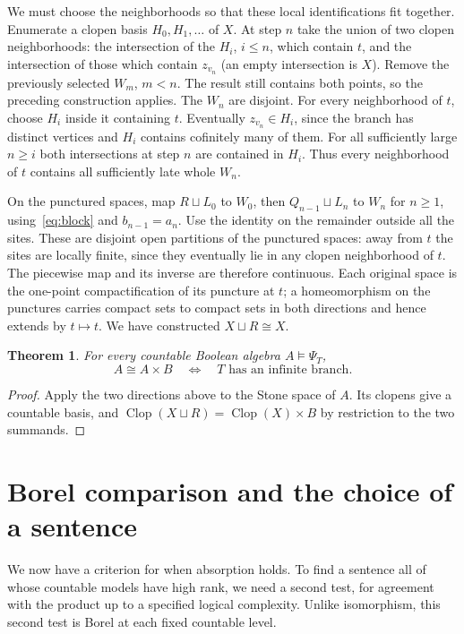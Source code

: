 \documentclass[11pt,letterpaper]{article}
\newtheorem{theorem}{Theorem}[section]
\theoremstyle{definition}\newtheorem{definition}[theorem]{Definition}
\newcommand{\Clop}{\operatorname{Clop}}
\begin{document}
We must choose the neighborhoods so that these local identifications fit
together. Enumerate a clopen basis \(H_0,H_1,\ldots\) of \(X\). At step
\(n\) take the union of two clopen neighborhoods: the intersection of the
\(H_i\), \(i\le n\), which contain \(t\), and the intersection of those
which contain \(z_{v_n}\) (an empty intersection is \(X\)). Remove the
previously selected \(W_m\), \(m<n\). The result still contains both
points, so the preceding construction applies. The \(W_n\) are disjoint.
For every neighborhood of \(t\), choose \(H_i\) inside it containing
\(t\). Eventually \(z_{v_n}\in H_i\), since the branch has distinct
vertices and \(H_i\) contains cofinitely many of them. For all sufficiently
large \(n\ge i\) both intersections at step \(n\) are contained in
\(H_i\). Thus every neighborhood of \(t\) contains all sufficiently late
whole \(W_n\).

On the punctured spaces, map \(R\sqcup L_0\) to \(W_0\), then
\(Q_{n-1}\sqcup L_n\) to \(W_n\) for \(n\ge1\), using~\eqref{eq:block}
and \(b_{n-1}=a_n\). Use the identity on the remainder outside all the
sites. These are disjoint open partitions of the punctured spaces: away
from \(t\) the sites are locally finite, since they eventually lie in
any clopen neighborhood of \(t\). The piecewise map and its inverse are
therefore continuous. Each original space is the one-point compactification
of its puncture at \(t\); a homeomorphism on the punctures carries compact
sets to compact sets in both directions and hence extends by \(t\mapsto t\).
We have constructed \(X\sqcup R\cong X\).

\begin{theorem}\label{thm:absorb}
For every countable Boolean algebra \(A\models\Psi_T\),
\[
                       A\cong A\times B
       \quad\Longleftrightarrow\quad T\text{ has an infinite branch}.
\]
\end{theorem}
\begin{proof}
Apply the two directions above to the Stone space of \(A\). Its clopens
give a countable basis, and \(\Clop(X\sqcup R)=\Clop(X)\times B\) by
restriction to the two summands.
\end{proof}
\section{Borel comparison and the choice of a sentence}\label{sec:diagonal}
We now have a criterion for when absorption holds. To find a sentence
all of whose countable models have high rank, we need a second test, for
agreement with the product up to a specified logical complexity. Unlike
isomorphism, this second test is Borel at each fixed countable level.
\end{document}
